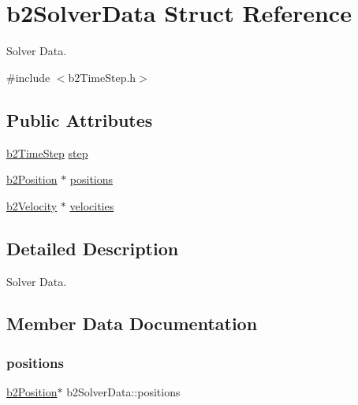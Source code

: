 \hypertarget{structb2_solver_data}{}\section{b2\+Solver\+Data Struct Reference}
\label{structb2_solver_data}


Solver Data.  




{\ttfamily \#include $<$b2\+Time\+Step.\+h$>$}

\subsection*{Public Attributes}
\begin{DoxyCompactItemize}
\item 
\mbox{\hyperlink{structb2_time_step}{b2\+Time\+Step}} \mbox{\hyperlink{structb2_solver_data_a99998296de1b4f128c396def56392eea}{step}}
\item 
\mbox{\hyperlink{structb2_position}{b2\+Position}} $\ast$ \mbox{\hyperlink{structb2_solver_data_a5eb6ee68b42d96164579a4a0df8be04b}{positions}}
\item 
\mbox{\hyperlink{structb2_velocity}{b2\+Velocity}} $\ast$ \mbox{\hyperlink{structb2_solver_data_a1072627a3e962a8bc7088657a512191c}{velocities}}
\end{DoxyCompactItemize}


\subsection{Detailed Description}
Solver Data. 

\subsection{Member Data Documentation}
\mbox{\label{structb2_solver_data_a5eb6ee68b42d96164579a4a0df8be04b}} 
\subsubsection{\texorpdfstring{positions}{positions}}
{\footnotesize\ttfamily \mbox{\hyperlink{structb2_position}{b2\+Position}}$\ast$ b2\+Solver\+Data\+::positions}

\mbox{\label{structb2_solver_data_a99998296de1b4f128c396def56392eea}} 
